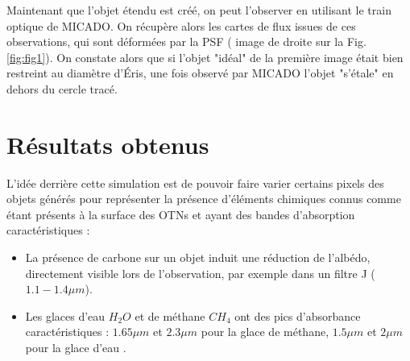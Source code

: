 \documentclass[11pt]{aa}
\begin{document}
Maintenant que l'objet étendu est créé, on peut l'observer en utilisant le train optique de MICADO. On récupère alors les cartes de flux issues de ces observations, qui sont déformées par la PSF ( image de droite sur la Fig.\ref{fig:fig1}). On constate alors que si l'objet "idéal" de la première image était bien restreint au diamètre d'Éris, une fois observé par MICADO l'objet "s'étale" en dehors du cercle tracé.

\section{Résultats obtenus}
L'idée derrière cette simulation est de pouvoir faire varier certains pixels des objets générés pour représenter la présence d'éléments chimiques connus comme étant présents à la surface des OTNs et ayant des bandes d'absorption caractéristiques : 
\begin{itemize}
    \item[\textbullet] La présence de carbone sur un objet induit une réduction de l'albédo, directement visible lors de l'observation, par exemple dans un filtre J ($1.1-1.4 \mu m$).
    \item[\textbullet] Les glaces d'eau $H_2O$ et de méthane $CH_4$ ont des pics d'absorbance caractéristiques : $1.65\mu m$ et $2.3 \mu m$ pour la glace de méthane, $1.5 \mu m$ et $2 \mu m$ pour la glace d'eau \citep{these_merlin}.
\end{itemize}
\end{document}
